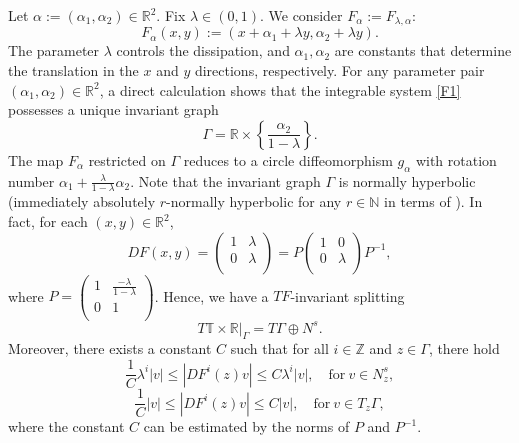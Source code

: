 \documentclass{amsart}
\newcommand{\N}{\mathbb{N}}
\newcommand{\Z}{\mathbb{Z}}
\newcommand{\R}{\mathbb{R}}
\newcommand{\la}{\lambda}
\newcommand{\al}{\alpha}
\theoremstyle{definition}
\begin{document}
Let $\alpha:=(\alpha_1,\alpha_2)\in \R^2$. Fix $\lambda\in (0,1)$. We consider $F_{\alpha}:=F_{\la,\al}$:
\begin{equation}\label{F1}
F_{\alpha}(x,y):=(x+\alpha_1+\lambda y,\alpha_2+\lambda y).
\end{equation}
The parameter $\lambda$ controls the dissipation, and $\alpha_1,\alpha_2$
 are constants that determine the translation in the $x$ and $y$ directions, respectively. For any parameter pair $(\alpha_1,\alpha_2) \in \mathbb{R}^2$, a direct calculation shows that the integrable system \eqref{F1} possesses a unique invariant graph
\begin{equation}\label{ingm1}
\Gamma = \mathbb{R} \times \left\{\frac{\alpha_2}{1-\lambda}\right\}.
\end{equation}
The map $F_{\alpha}$ restricted on $\Gamma$ reduces to a circle diffeomorphism $g_\al$ with rotation number $\al_1+\frac{\lambda}{1-\lambda}\al_2$. Note that the invariant graph $\Gamma$  is normally hyperbolic (immediately absolutely $r$-normally hyperbolic for any $r\in\N$ in terms of \cite[Definition 2]{HPS}). In fact, for each $(x,y)\in\R^2$,
\[DF(x,y)=\left(
            \begin{array}{cc}
              1 & \la \\
              0 & \la \\
            \end{array}
          \right)=P\left(
            \begin{array}{cc}
              1 & 0 \\
              0 & \la \\
            \end{array}
          \right)P^{-1},
\]
where $P=\left(
            \begin{array}{cc}
              1 & \frac{-\la}{1-\la} \\
              0 & 1 \\
            \end{array}
          \right)$. Hence, we have a $TF$-invariant splitting
\[T\mathbb{T}\times\R|_\Gamma=T\Gamma\oplus N^s.\]
   Moreover, there exists a constant $C$ such that for all $i\in\Z$ and $z\in \Gamma$, there hold
   \begin{equation}\label{hype}
   \frac{1}{C}\la^i|v|\leq |DF^i(z)v|\leq C\la^i|v|,\quad \mathrm{for}\ v\in N^s_z,
   \end{equation}
    \[\frac{1}{C}|v|\leq |DF^i(z)v|\leq C|v|,\quad \mathrm{for}\ v\in T_z\Gamma,\]
    where the constant $C$ can be estimated by the norms of $P$ and $P^{-1}$.
\end{document}
